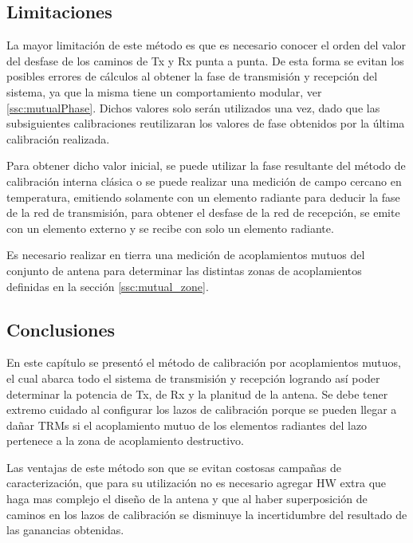 \subsection{Limitaciones}

La mayor limitación de este método es que es necesario conocer el orden del valor del desfase de los caminos de Tx y Rx punta a
punta. De esta forma se evitan los posibles errores de cálculos al obtener la fase de transmisión y recepción del sistema, ya
que la misma tiene un comportamiento modular, ver \ref{ssc:mutualPhase}. Dichos valores solo serán utilizados una vez, dado que
las subsiguientes calibraciones reutilizaran los valores de fase obtenidos por la última calibración realizada.

Para obtener dicho valor inicial, se puede utilizar la fase resultante del método de calibración interna clásica o se puede
realizar una medición de campo cercano en temperatura, emitiendo solamente con un elemento radiante para deducir la fase de la
red de transmisión, para obtener el desfase de la red de recepción, se emite con un elemento externo y se recibe con solo un
elemento radiante.

Es necesario realizar en tierra una medición de acoplamientos mutuos del conjunto de antena para determinar las distintas zonas
de acoplamientos definidas en la sección \ref{ssc:mutual_zone}.

\subsection{Conclusiones}

En este capítulo se presentó el método de calibración por acoplamientos mutuos, el cual abarca todo el sistema de
transmisión y recepción logrando así poder determinar la potencia de Tx, de Rx y la planitud de la antena. Se debe tener
extremo cuidado al configurar los lazos de calibración porque se pueden llegar a dañar TRMs si el acoplamiento mutuo de los
elementos radiantes del lazo pertenece a la zona de acoplamiento destructivo.

Las ventajas de este método son que se evitan costosas campañas de caracterización, que para su utilización no es necesario
agregar HW extra que haga mas complejo el diseño de la antena y que al haber superposición de caminos en los lazos de
calibración se disminuye la incertidumbre del resultado de las ganancias obtenidas.
